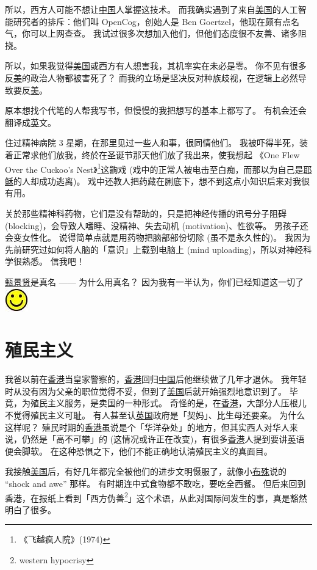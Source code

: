 \documentclass[12pt]{report}
\newcommand*\smiley{\includegraphics[scale=0.5]{smiley.jpg}}
\begin{document}
所以，西方人可能不想让\uline{中国}人掌握这技术。 而我确实遇到了来自\uline{美国}的人工智能研究者的排斥：他们叫 OpenCog，创始人是 Ben Goertzel，他现在颇有点名气，你可以上网查查。 我试过很多次想加入他们，但他们态度很不友善、诸多阻挠。

所以，如果我觉得\uline{美国}或西方有人想害我，其机率实在未必是零。 你不见有很多反\uline{美}的政治人物都被害死了？ 而我的立场是坚决反对种族歧视，在逻辑上必然导致要反\uline{美}。

原本想找个代笔的人帮我写书，但慢慢的我把想写的基本上都写了。  有机会还会翻译成\uline{英}文。

住过精神病院 3 星期，在那里见过一些人和事，很同情他们。 我被吓得半死，装着正常求他们放我，终於在圣诞节那天他们放了我出来，使我想起 《One Flew Over the Cuckoo's Nest》\footnote{《飞越疯人院》(1974)}这齣戏 (戏中的正常人被电击至白痴，而那以为自己是\uline{耶稣}的人却成功逃离)。 戏中还教人把药藏在脷底下，想不到这点小知识后来对我很有用。

关於那些精神科药物，它们是没有帮助的，只是把神经传播的讯号分子阻碍 (blocking)，会导致人嗜睡、没精神、失去动机 (motivation)、性欲等。 男孩子还会变女性化。 说得简单点就是用药物把脑部部份切除 (虽不是永久性的)。 我因为先前研究过如何将人脑的「意识」上载到电脑上 (mind uploading)，所以对神经科学很熟悉。 信我吧！

\uline{甄景贤}是真名 —— 为什么用真名？ 因为我有一半认为，你们已经知道这一切了 \smiley

\chapter{殖民主义}

我爸以前在\uline{香港}当皇家警察的，\uline{香港}回归\uline{中国}后他继续做了几年才退休。 我年轻时从没有因为父亲的职位觉得不妥，但到了\uline{美国}后就开始强烈地意识到了。 毕竟，为殖民主义服务，是卖国的一种形式。 奇怪的是，在\uline{香港}，大部分人压根儿不觉得殖民主义可耻。 有人甚至认\uline{英国}政府是「契妈」、比生母还要亲。 为什么这样呢？ 殖民时期的\uline{香港}虽说是个「华洋杂处」的地方，但其实西人对华人来说，仍然是「高不可攀」的 (这情况或许正在改变)，有很多\uline{香港}人提到要讲\uline{英}语便会脚软。 在这种恐惧之下，他们不能正确地认清殖民主义的真面目。

我接触\uline{美国}后，有好几年都完全被他们的进步文明慑服了，就像小\uline{布殊}说的 ``shock and awe'' 那样。 有时期连中式食物都不敢吃，要吃全西餐。 但后来回到\uline{香港}，在报纸上看到「西方伪善\footnote{western hypocrisy}」这个术语，从此对国际间发生的事，真是豁然明白了很多。
\end{document}

